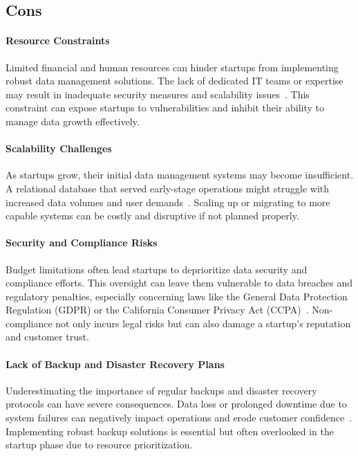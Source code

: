\documentclass{article}
\begin{document}
\subsection*{Cons}

\paragraph{Resource Constraints}
Limited financial and human resources can hinder startups from implementing robust data management solutions. The lack of dedicated IT teams or expertise may result in inadequate security measures and scalability issues~\cite{forbes_challenges}. This constraint can expose startups to vulnerabilities and inhibit their ability to manage data growth effectively.

\paragraph{Scalability Challenges}
As startups grow, their initial data management systems may become insufficient. A relational database that served early-stage operations might struggle with increased data volumes and user demands~\cite{infoworld_relational_to_nosql}. Scaling up or migrating to more capable systems can be costly and disruptive if not planned properly.

\paragraph{Security and Compliance Risks}
Budget limitations often lead startups to deprioritize data security and compliance efforts. This oversight can leave them vulnerable to data breaches and regulatory penalties, especially concerning laws like the General Data Protection Regulation (GDPR) or the California Consumer Privacy Act (CCPA)~\cite{eu_gdpr}. Non-compliance not only incurs legal risks but can also damage a startup's reputation and customer trust.

\paragraph{Lack of Backup and Disaster Recovery Plans}
Underestimating the importance of regular backups and disaster recovery protocols can have severe consequences. Data loss or prolonged downtime due to system failures can negatively impact operations and erode customer confidence~\cite{cio_disaster_recovery}. Implementing robust backup solutions is essential but often overlooked in the startup phase due to resource prioritization.
\end{document}

